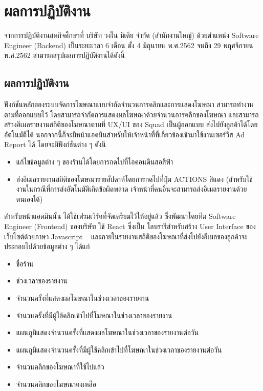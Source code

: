 \chapter{ผลการปฏิบัติงาน}
\label{chapter:result}
จากการปฏิบัติงานสหกิจศึกษาที่ บริษัท วงใน มีเดีย จำกัด (สำนักงานใหญ่) ด้วยตำแหน่ง Software Engineer (Backend) เป็นระยะเวลา 6 เดือน ตั้ง 4 มิถุนายน พ.ศ.2562 จนถึง 29 พฤศจิกายน พ.ศ.2562 สามารถสรุปผลการปฏิบัติงานได้ดังนี้
	
\section{ผลการปฏิบัติงาน}
ฟังก์ชันหลักของระบบจัดการโฆษณาแบบจำกัดจำนวนการคลิกและการแสดงโฆษณา สามารถทำงานตามที่ออกแบบไว้ โดยสามารถจำกัดการแสดงผลโฆษณาด้วยจำนวนการคลิกของโฆษณา และสามารถสร้างอีเมลรายงานสถิติของโฆษณาตามที่ UX/UI ของ Squad เป็นผู้ออกแบบ ส่งไปยังลูกค้าได้โดยอัตโนมัติได้ นอกจากนี้ก็จะมีหน้าแอดมินสำหรับให้เจ้าหน้าที่ที่เกี่ยวข้องเข้ามาใช้งานเซอร์วิส Ad Report ได้ โดยจะมีฟังก์ชันต่าง ๆ ดังนี
\begin{itemize}
	\item แก้ไขข้อมูลต่าง ๆ ของร้านได้โดยการกดไปที่ไอคอนดินสอสีฟ้า
	\item ส่งอีเมลรายงานสถิติของโฆษณารายสัปดาห์โดยการกดไปที่ปุ่ม ACTIONS สีแดง (สำหรับใช้งานในกรณีที่การส่งอัตโนมัติเกิดข้อผิดพลาด เจ้าหน้าที่คนอื่นจะสามารถส่งอีเมลรายงานด้วยตนเองได้) 
\end{itemize}

สำหรับหน้าแอดมินนั้น ได้ใช้เฟรมเวิร์คที่จัดเตรียมไว้ให้อยู่แล้ว ซึ่งพัฒนาโดยทีม Software Engineer (Frontend) ของบริษัท ใช้ React ซึ่งเป็น ไลบรารีสำหรับสร้าง User Interface ของเว็บไซต์ด้วยภาษา Javascript ~\cite{react} และภายในรายงานสถิติของโฆษณาที่ส่งไปยังอีเมลของลูกค้าจะประกอบไปด้วยข้อมูลต่าง ๆ ได้แก่
\begin{itemize}
	\item ชื่อร้าน
	\item ช่วงเวลาของรายงาน
	\item จำนวนครั้งที่แสดงผลโฆษณาในช่วงเวลาของรายงาน
	\item จำนวนครั้งที่มีผู้ใช้คลิกเข้าไปที่โฆษณาในช่วงเวลาของรายงาน
	\item แผนภูมิแสดงจำนวนครั้งที่แสดงผลโฆษณาในช่วงเวลาของรายงานต่อวัน
	\item แผนภูมิแสดงจำนวนครั้งที่มีผู้ใช้คลิกเข้าไปที่โฆษณาในช่วงเวลาของรายงานต่อวัน
	\item จำนวนคลิกของโฆษณาที่ใช้ไปแล้ว
	\item จำนวนคลิกของโฆษณาคงเหลือ
\end{itemize}

